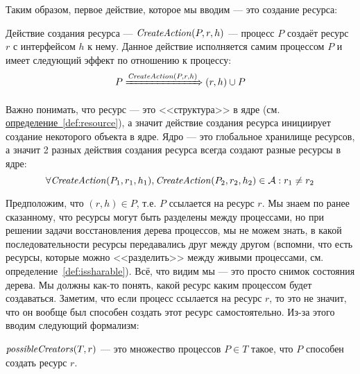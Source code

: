Таким образом, первое действие, которое мы вводим --- это создание ресурса:

\begin{defn}
\label{def:createact}
Действие создания ресурса --- $\text{\textit{CreateAction}}(P, r, h)$ --- процесс $P$ создаёт ресурс $r$ с интерфейсом $h$ к нему. Данное действие исполняется самим процессом $P$ и имеет следующий эффект по отношению к процессу:
\begin{equation*}
	P \xRightarrow{\text{\textit{CreateAction}}(P, r, h)} (r, h) \cup P
\end{equation*}
\end{defn}

\begin{note}
Важно понимать, что ресурс --- это <<структура>> в ядре (см. \hyperref[def:resource]{определение~\ref*{def:resource}}), а значит действие создания ресурса инициирует создание некоторого объекта в ядре. Ядро --- это глобальное хранилище ресурсов, а значит 2 разных действия создания ресурса всегда создают разные ресурсы в ядре:
\begin{equation*}
	\forall \text{\textit{CreateAction}}(P_1, r_1, h_1), \text{\textit{CreateAction}}(P_2, r_2, h_2) \in \mathcal{A}: r_1 \neq r_2
\end{equation*}
\end{note}

Предположим, что $(r, h) \in P$, т.е. $P$ ссылается на ресурс $r$. Мы знаем по ранее сказанному, что ресурсы могут быть разделены между процессами, но при решении задачи восстановления дерева процессов, мы не можем знать, в какой последовательности ресурсы передавались друг между другом (вспомни, что есть ресурсы, которые можно <<разделить>> между живыми процессами, см. определение~\ref{def:issharable}). Всё, что видим мы --- это просто снимок состояния дерева. Мы должны как-то понять, какой ресурс каким процессом будет создаваться. Заметим, что если процесс ссылается на ресурс $r$, то это не значит, что он вообще был способен создать этот ресурс самостоятельно. Из-за этого вводим следующий формализм:

\begin{defn}
\label{def:possiblecrtrs}
$\text{\textit{possibleCreators}}(T, r)$ --- это множество процессов $P \in T$ такое, что $P$ способен создать ресурс $r$.
\end{defn}

